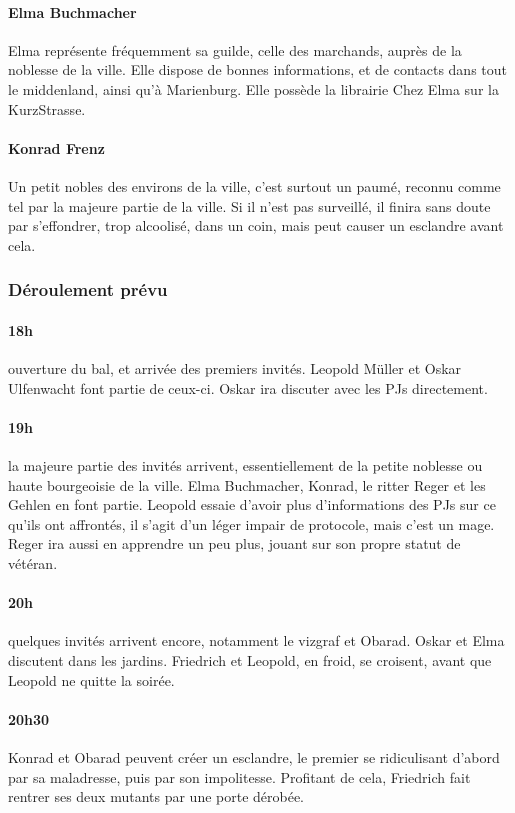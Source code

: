 \documentclass[10pt,a4paper]{book}
\begin{document}
\paragraph{Elma Buchmacher}Elma représente fréquemment sa guilde, celle des marchands, auprès de la noblesse de la ville. Elle dispose de bonnes informations, et de contacts dans tout le middenland, ainsi qu'à Marienburg. Elle possède la librairie Chez Elma sur la KurzStrasse.
\paragraph{Konrad Frenz} Un petit nobles des environs de la ville, c'est surtout un paumé, reconnu comme tel par la majeure partie de la ville. Si il n'est pas surveillé, il finira sans doute par s'effondrer, trop alcoolisé, dans un coin, mais peut causer un esclandre avant cela.
\subsubsection{Déroulement prévu}
\paragraph{18h} ouverture du bal, et arrivée des premiers invités. Leopold Müller et Oskar Ulfenwacht font partie de ceux-ci. Oskar ira discuter avec les PJs directement.
\paragraph{19h} la majeure partie des invités arrivent, essentiellement de la petite noblesse ou haute bourgeoisie de la ville. Elma Buchmacher, Konrad, le ritter Reger et les Gehlen en font partie. Leopold essaie d'avoir plus d'informations des PJs sur ce qu'ils ont affrontés, il s'agit d'un léger impair de protocole, mais c'est un mage. Reger ira aussi en apprendre un peu plus, jouant sur son propre statut de vétéran.
\paragraph{20h}quelques invités arrivent encore, notamment le vizgraf et Obarad. Oskar et Elma discutent dans les jardins. Friedrich et Leopold, en froid, se croisent, avant que Leopold ne quitte la soirée. 
\paragraph{20h30}Konrad et Obarad peuvent créer un esclandre, le premier se ridiculisant d'abord par sa maladresse, puis par son impolitesse. Profitant de cela, Friedrich fait rentrer ses deux mutants par une porte dérobée.
\end{document}
